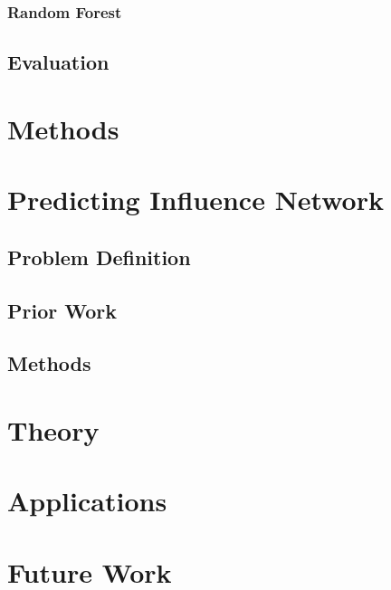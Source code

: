 \subsection{Random Forest}


\section{Evaluation}

\chapter{Methods}


\chapter{Predicting Influence Network}
\section{Problem Definition}
\section{Prior Work}
\section{Methods}



\chapter{Theory}


\chapter{Applications}


\chapter{Future Work}






 

